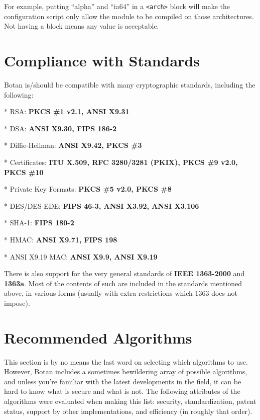 \documentclass{article}
\begin{document}
\noindent
For example, putting ``alpha'' and ``ia64'' in a \texttt{<arch>} block will
make the configuration script only allow the module to be compiled on those
architectures. Not having a block means any value is acceptable.

\pagebreak

\section{Compliance with Standards}

Botan is/should be compatible with many cryptographic standards, including the
following:

\newcommand{\standard}[2]{
   \vskip 4pt
   * #1: \textbf{#2}
}

\standard{RSA}{PKCS \#1 v2.1, ANSI X9.31}

\standard{DSA}{ANSI X9.30, FIPS 186-2}

\standard{Diffie-Hellman}{ANSI X9.42, PKCS \#3}

\standard{Certificates}{ITU X.509, RFC 3280/3281 (PKIX), PKCS \#9 v2.0,
PKCS \#10}

\standard{Private Key Formats}{PKCS \#5 v2.0, PKCS \#8}

\standard{DES/DES-EDE}{FIPS 46-3, ANSI X3.92, ANSI X3.106}

\standard{SHA-1}{FIPS 180-2}

\standard{HMAC}{ANSI X9.71, FIPS 198}

\standard{ANSI X9.19 MAC}{ANSI X9.9, ANSI X9.19}

\vskip 8pt
\noindent
There is also support for the very general standards of \textbf{IEEE 1363-2000}
and \textbf{1363a}. Most of the contents of such are included in the standards
mentioned above, in various forms (usually with extra restrictions which 1363
does not impose).

\pagebreak

\section{Recommended Algorithms}

This section is by no means the last word on selecting which algorithms to use.
However, Botan includes a sometimes bewildering array of possible algorithms,
and unless you're familiar with the latest developments in the field, it can be
hard to know what is secure and what is not. The following attributes of the
algorithms were evaluated when making this list: security, standardization,
patent status, support by other implementations, and efficiency (in roughly
that order).
\end{document}

